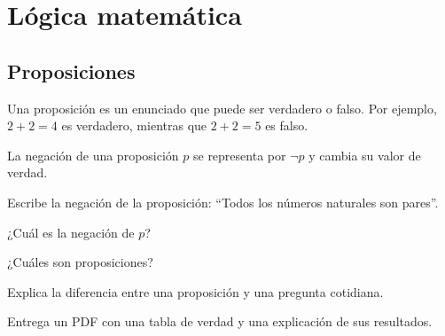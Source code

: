 \chapter{Lógica matemática}
\section{Proposiciones}

\begin{lesson}[id=intro-proposiciones,weight=0]
Una proposición es un enunciado que puede ser verdadero o falso. Por ejemplo, \(2+2=4\) es verdadero, mientras que \(2+2=5\) es falso.
\end{lesson}

\begin{definition}[id=def-negacion,title={Negación},weight=0]
La negación de una proposición \(p\) se representa por \(\neg p\) y cambia su valor de verdad.
\end{definition}

\begin{activity}[id=respuesta-negacion,type=short,weight=1,due=2026-11-15]
Escribe la negación de la proposición: “Todos los números naturales son pares”.
\end{activity}

\begin{activity}[id=tabla-verdad,type=choice,weight=2]
¿Cuál es la negación de \(p\)?
\end{activity}

\begin{activity}[id=tabla-verdad,type=multiple-choice,weight=1]
¿Cuáles son proposiciones?

\end{activity}

\begin{activity}[id=explicacion,type=long,weight=2]
Explica la diferencia entre una proposición y una pregunta cotidiana.
\end{activity}

\begin{deliverable}[id=entrega-logica,type=upload,weight=3,due=2026-12-01]
Entrega un PDF con una tabla de verdad y una explicación de sus resultados.
\end{deliverable}

\begin{table}[id=tabla-notacion,header=teal]
\end{table}
